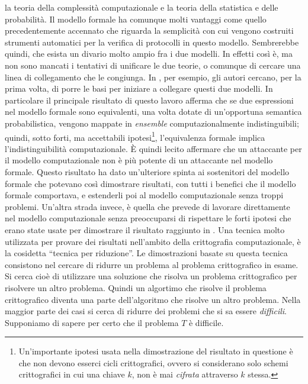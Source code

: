 \documentclass[a4paper,openright,twoside,12pt]{report}
\begin{document}
la teoria della complessit\`a computazionale e la teoria della statistica e delle probabilit\`a.
Il modello formale ha comunque molti vantaggi come quello precedentemente accennato che riguarda la semplicit\`a 
con cui vengono costruiti strumenti automatici per la verifica di protocolli in questo modello.
Sembrerebbe quindi, che esista un divario molto ampio fra i due modelli. In effetti cos\`i \`e, ma non sono mancati i tentativi di unificare le due teorie, o comunque di cercare una linea
di collegamento che le congiunga.
In \cite{DBLP:journals/joc/AbadiR07}, per esempio, gli autori cercano, per la prima volta, di porre le basi per iniziare a collegare questi due modelli.
In particolare il principale risultato di questo lavoro afferma che se due espressioni nel modello formale sono equivalenti, una volta dotate di un'opportuna semantica probabilistica,
vengono mappate in \emph{ensemble} computazionalmente indistinguibili; quindi, sotto forti, ma accettabili ipotesi\footnote{Un'importante ipotesi usata nella dimostrazione del risultato in questione
\`e che non devono esserci cicli crittografici, ovvero si considerano solo schemi crittografici in cui una chiave $k$, non \`e mai \emph{cifrata} attraverso $k$ stessa.}, 
l'equivalenza formale implica l'indistinguibilit\`a computazionale.
\`E quindi lecito affermare che un attaccante per il modello computazionale non \`e pi\`u potente di un attaccante nel modello formale. Questo risultato ha dato un'ulteriore spinta
ai sostenitori del modello formale che potevano cos\`i dimostrare risultati, con tutti i benefici che il modello formale comportava, 
e estenderli poi al modello computazionale senza troppi problemi.
Un'altra strada invece, \`e quella che prevede di lavorare direttamente nel modello computazionale senza preoccuparsi di rispettare le forti ipotesi che erano 
state usate per dimostrare il risultato raggiunto in \cite{DBLP:journals/joc/AbadiR07}.
Una tecnica molto utilizzata per provare dei risultati nell'ambito della crittografia computazionale, 
\`e la cosidetta ``tecnica per riduzione''. 
Le dimostrazioni basate su questa tecnica consistono nel cercare di ridurre un problema al problema crittografico in esame. 
Si cerca cio\`e di utilizzare una soluzione che risolva un problema crittografico
per risolvere un altro problema. Quindi un algortimo che risolve il problema crittografico diventa
una parte dell'algoritmo che risolve un altro problema.
Nella maggior parte dei casi si cerca di ridurre dei problemi che si sa essere \emph{difficili}. 
Supponiamo di sapere per certo che il problema $T$ \`e difficile. 
\end{document}
